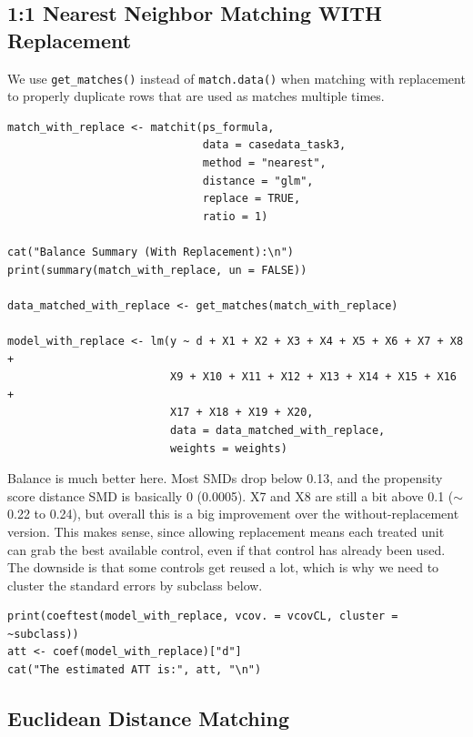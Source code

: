 \documentclass[12pt,a4paper]{article}
\begin{document}
\subsection{1:1 Nearest Neighbor Matching WITH Replacement}

We use \texttt{get\_matches()} instead of \texttt{match.data()} when matching with replacement to properly duplicate rows that are used as matches multiple times.

\begin{lstlisting}
match_with_replace <- matchit(ps_formula,
                              data = casedata_task3,
                              method = "nearest",
                              distance = "glm",
                              replace = TRUE,
                              ratio = 1)

cat("Balance Summary (With Replacement):\n")
print(summary(match_with_replace, un = FALSE))

data_matched_with_replace <- get_matches(match_with_replace)

model_with_replace <- lm(y ~ d + X1 + X2 + X3 + X4 + X5 + X6 + X7 + X8 +
                         X9 + X10 + X11 + X12 + X13 + X14 + X15 + X16 +
                         X17 + X18 + X19 + X20,
                         data = data_matched_with_replace,
                         weights = weights)
\end{lstlisting}

Balance is much better here. Most SMDs drop below 0.13, and the propensity score distance SMD is basically 0 (0.0005). X7 and X8 are still a bit above 0.1 ($\sim$0.22 to 0.24), but overall this is a big improvement over the without-replacement version. This makes sense, since allowing replacement means each treated unit can grab the best available control, even if that control has already been used. The downside is that some controls get reused a lot, which is why we need to cluster the standard errors by subclass below.

\begin{lstlisting}
print(coeftest(model_with_replace, vcov. = vcovCL, cluster = ~subclass))
att <- coef(model_with_replace)["d"]
cat("The estimated ATT is:", att, "\n")
\end{lstlisting}

\subsection{Euclidean Distance Matching}
\end{document}
